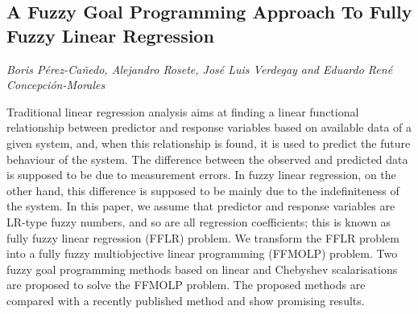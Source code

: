 \documentclass[../booklet.tex]{subfiles}
\begin{document}
\subsection[A Fuzzy Goal Programming Approach To Fully Fuzzy Linear Regression. {\it Boris Pérez-Cañedo, Alejandro Rosete, José Luis Verdegay and Eduardo René Concepción-Morales}]{A Fuzzy Goal Programming Approach To Fully Fuzzy Linear Regression}
   

\begin{center}
  {\it Boris Pérez-Cañedo, Alejandro Rosete, José Luis Verdegay and Eduardo René Concepción-Morales}
\end{center}



Traditional linear regression analysis aims at finding a linear functional relationship between predictor and response variables based on available data of a given system, and, when this relationship is found, it is used to predict the future behaviour of the system. The difference between the observed and predicted data is supposed to be due to measurement errors. In fuzzy linear regression, on the other hand, this difference is supposed to be mainly due to the indefiniteness of the system. In this paper, we assume that predictor and response variables are LR-type fuzzy numbers, and so are all regression coefficients; this is known as fully fuzzy linear regression (FFLR) problem. We transform the FFLR problem into a fully fuzzy multiobjective linear programming (FFMOLP) problem. Two fuzzy goal programming methods based on linear and Chebyshev scalarisations are proposed to solve the FFMOLP problem. The proposed methods are compared with a recently published method and show promising results.

\end{document}
